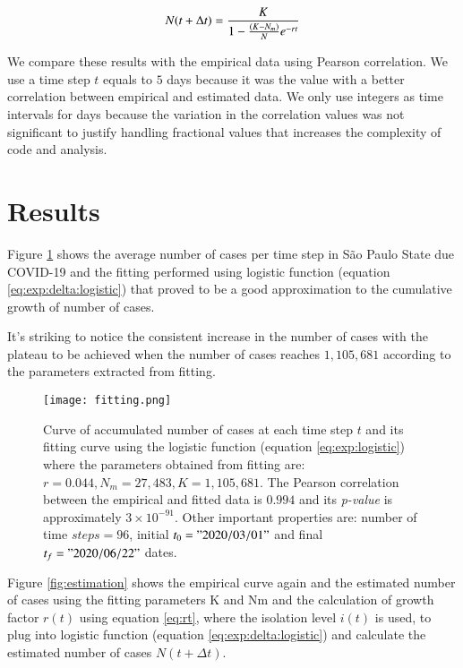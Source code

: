 \documentclass[review]{elsarticle}
\begin{document}
\begin{equation}
N(t+\Delta t) = {K \over {1- {(K-N_{m}) \over N} e^{-rt}}}
\label{eq:exp:delta:logistic}
\end{equation}

 We compare these results with the empirical data using Pearson correlation.
 We use a time step $t$ 
 equals to $5$ days because it was the value with
 a better correlation between empirical and estimated data. 
We only use integers as time intervals for days because
 the variation in the correlation values was not
 significant to justify handling fractional 
values  that increases the complexity
 of code and analysis.

\section{Results}

Figure \ref{fig:fitting} shows the average number of cases per 
time step in São Paulo State due COVID-19 and 
the fitting performed using logistic function (equation \ref{eq:exp:delta:logistic}) 
that proved to be a good approximation to the 
cumulative growth of number of cases.

It’s striking to notice the consistent increase in the number of cases 
with the plateau to be achieved when the number of cases reaches $1,105,681$ 
according to the parameters extracted from fitting.

\begin{figure}
\texttt{[image: fitting.png]}
\caption{Curve of accumulated number of cases 
at each time step $t$ and its fitting curve 
using the logistic function (equation \ref{eq:exp:logistic}) 
where the parameters obtained from fitting are: 
$r=0.044, N_m=27,483, K=1,105,681$. 
The Pearson correlation between the empirical 
and fitted data is $0.994$ and 
its {\it p-value\/} is approximately $3\times 10^{-91}$.  
Other important properties are: 
number of time $steps=96$, 
initial $t_{0}="2020/03/01"$ 
and final $t_{f}="2020/06/22"$ 
dates.}
\label{fig:fitting}
\end{figure}

Figure \ref{fig:estimation} shows the empirical curve again 
and the estimated number of cases using 
the fitting parameters K and Nm 
and the calculation of growth factor $r(t)$ using equation \ref{eq:rt}, 
where the isolation level $i(t)$ is used, 
to plug into logistic function (equation \ref{eq:exp:delta:logistic}) 
and calculate the estimated number of cases $N(t+\Delta t)$.
\end{document}

